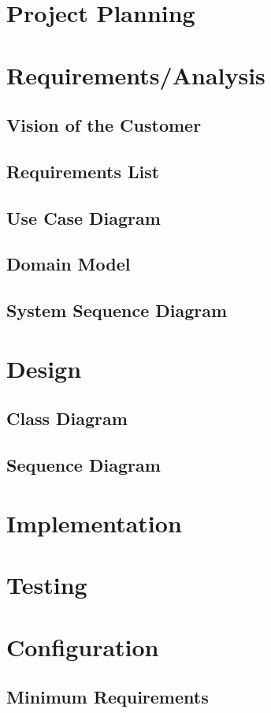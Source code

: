 \documentclass{article}
\begin{document}
\section{Project Planning}
\section{Requirements/Analysis}
\subsection{Vision of the Customer}
\subsection{Requirements List}
\subsection{Use Case Diagram}
\subsection{Domain Model}
\subsection{System Sequence Diagram}
\section{Design}
\subsection{Class Diagram}
\subsection{Sequence Diagram}
\section{Implementation}
\section{Testing}
\section{Configuration}
\subsection{Minimum Requirements}
\end{document}
